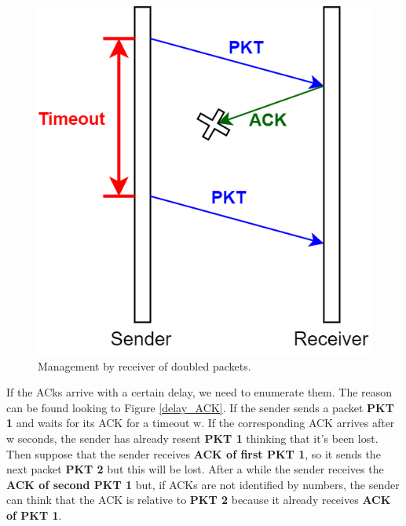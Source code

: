 \begin{figure}[H]
\centering\footnotesize
\includegraphics[scale=0.4]{Images/Transport/loss_ACK}
\caption{Management by receiver of doubled packets.}\label{loss_ACK}
\end{figure}

If the ACks arrive with a certain delay, we need to enumerate them. The reason can be found looking to Figure \ref{delay_ACK}. If the sender sends a packet \textbf{PKT 1} and waits for its ACK for a timeout w. If the corresponding ACK arrives after w seconds, the sender has already resent \textbf{PKT 1} thinking that it's been lost.\\
Then suppose that the sender receives \textbf{ACK of first PKT 1}, so it sends the next packet \textbf{PKT 2} but this will be lost. After a while the sender receives the \textbf{ACK of second PKT 1} but, if ACKs are not identified by numbers, the sender can think that the ACK is relative to \textbf{PKT 2} because it already receives \textbf{ACK of PKT 1}.\\

